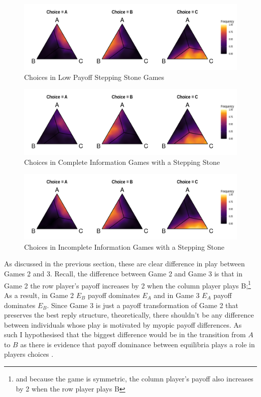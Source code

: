 \begin{figure}[h]
\captionsetup{justification=centering}
  \caption[caption]{Choices in Low Payoff Stepping Stone Games}
   \label{fig:Game3ChoiceFreq}
    \includegraphics[width = \textwidth]{Images/Game3ChoiceFreq.png}
\end{figure}

\begin{figure}[h]
\captionsetup{justification=centering}
  \caption[caption]{Choices in Complete Information Games with a Stepping Stone}
   \label{fig:GameCChoiceFreq}
    \includegraphics[width = \textwidth]{Images/GameCChoiceFreq.png}
\end{figure}

\begin{figure}[h]
\captionsetup{justification=centering}
  \caption[caption]{Choices in Incomplete Information Games with a Stepping Stone}
   \label{fig:GameIChoiceFreq}
    \includegraphics[width = \textwidth]{Images/GameIChoiceFreq.png}
\end{figure}

As discussed in the previous section, these are clear difference in play between Games 2 and 3. Recall, the difference between Game 2 and Game 3 is that in Game 2 the row player's payoff increases by 2 when the column player plays B;\footnote{and because the game is symmetric, the column player's payoff also increases by 2 when the row player plays B} As a result, in Game 2 $E_B$ payoff dominates $E_A$ and in Game 3 $E_A$ payoff dominates $E_B$. Since Game 3 is just a payoff transformation of Game 2 that preserves the best reply structure, theoretically, there shouldn't be any difference between individuals whose play is motivated by myopic payoff differences. As such I hypothesised that the biggest difference would be in the transition from $A$ to $B$ as there is evidence that payoff dominance between equilibria plays a role in players\textquotesingle{} choices \citep{harsanyi1988general, jagau2022}.


